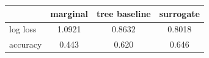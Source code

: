 \begin{tabular}{lccc}
\toprule
 & marginal & tree baseline & surrogate \\
\midrule
log loss & 1.0921 & 0.8632 & 0.8018 \\
accuracy & 0.443 & 0.620 & 0.646 \\
\bottomrule
\end{tabular}
